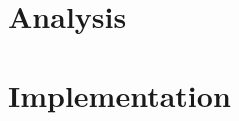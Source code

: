 \documentclass[11pt]{report}
\title{}
\subtitle{}
\begin{document}

    \maketitle

    \tableofcontents


    



    \part{Analysis}\label{part:analysis}
    
    
    


    \part{Implementation}\label{part:implementation}
    

    \appendix

    \printglossary[type=\acronymtype]

    \printbibliography[heading=bibintoc]
\end{document}
